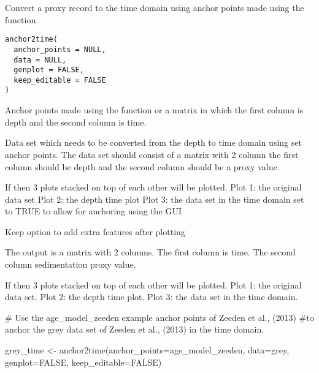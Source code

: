 \documentclass[a4paper]{book}
\begin{document}
%
\begin{Description}
Convert a proxy record to the time domain using anchor points made using the  function.
\end{Description}
%
\begin{Usage}
\begin{verbatim}
anchor2time(
  anchor_points = NULL,
  data = NULL,
  genplot = FALSE,
  keep_editable = FALSE
)
\end{verbatim}
\end{Usage}
%
\begin{Arguments}
\begin{ldescription}
\item[\code{anchor\_points}] Anchor points made using the  function or a matrix in which the first column is depth
and the second column is time.

\item[\code{data}] Data set which needs to be converted from the depth to time domain using set anchor points.
The data set should consist of a matrix with 2 column the first column should be depth
and the second column should be a proxy value.

\item[\code{genplot}] If   then 3 plots stacked on top of each other will be plotted.
Plot 1: the original data set
Plot 2: the depth time plot
Plot 3: the data set in the time domain
set to TRUE to allow for anchoring using the GUI

\item[\code{keep\_editable}] Keep option to add extra features after plotting  
\end{ldescription}
\end{Arguments}
%
\begin{Value}
The output is a matrix with 2 columns.
The first column is time.
The second column sedimentation proxy value.

If  then 3 plots stacked on top of each other will be plotted.
Plot 1: the original data set.
Plot 2: the depth time plot.
Plot 3: the data set in the time domain.
\end{Value}
%
\begin{Examples}
\begin{ExampleCode}
# Use the age_model_zeeden example anchor points of Zeeden et al., (2013)
#to anchor the grey data set of Zeeden et al., (2013) in the time domain.

grey_time <- anchor2time(anchor_points=age_model_zeeden,
data=grey,
genplot=FALSE,
keep_editable=FALSE)

\end{ExampleCode}
\end{Examples}
\end{document}
